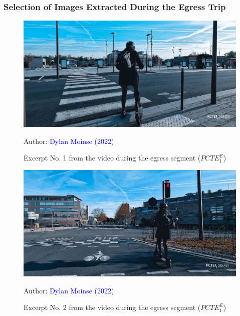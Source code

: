 \subsubsection{Selection of Images Extracted During the Egress Trip}

    \begin{figure}[h!]\vspace*{4pt}
        \caption*{Excerpt No. 1 from the video during the egress segment (\(PCTE^{E}_{1}\))}
        \centerline{\includegraphics[width=0.75\columnwidth]{src/Figures/Annexes/Extrait_Video_PCTE1_Egress_1.jpg}}
        \vspace{5pt}
        \begin{flushright}\scriptsize{
        Author: \textcolor{blue}{Dylan Moinse (2022)}
        }\end{flushright}
    \end{figure}

    \begin{figure}[h!]\vspace*{4pt}
        \caption*{Excerpt No. 2 from the video during the egress segment (\(PCTE^{E}_{1}\))}
        \centerline{\includegraphics[width=0.75\columnwidth]{src/Figures/Annexes/Extrait_Video_PCTE1_Egress_2.jpg}}
        \vspace{5pt}
        \begin{flushright}\scriptsize{
        Author: \textcolor{blue}{Dylan Moinse (2022)}
        }\end{flushright}
    \end{figure}

